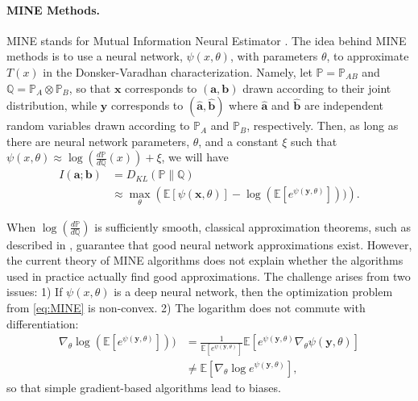 \documentclass[twoside]{article}
\theoremstyle{definition}
\newcommand{\E}{\mathbb{E}}
\newcommand{\Prob}{\mathbb{P}}
\newcommand{\Q}{\mathbb{Q}}
\newcommand{\1}[1]{\scalebox{1.25}{$\mathds{1}$}\left[#1\right]}
\begin{document}
\paragraph{\bf MINE Methods.}
MINE stands for Mutual Information Neural Estimator \cite{belghazi2018mutual}. The idea behind MINE methods is to use a neural network, $\psi(x,\theta)$, with parameters $\theta$, to approximate $T(x)$ in the Donsker-Varadhan characterization. Namely, let $\Prob=\Prob_{AB}$ and $\Q=\Prob_{A}\otimes \Prob_B$, so that $\bm{x}$ corresponds to $(\bm{a},\bm{b})$ drawn according to their joint distribution, while $\bm{y}$ corresponds to $(\hat{\bm{a}},\hat{\bm{b}})$ where $\hat{\bm{a}}$ and $\hat{\bm{b}}$ are independent random variables drawn according to $\Prob_A$ and $\Prob_B$, respectively. Then, as long as there are neural network parameters, $\theta$, and a constant $\xi$ such that $\psi(x,\theta)\approx \log\left(\frac{d\Prob}{d\Q}(x) \right)+\xi$, we will have
\begin{align}
\nonumber
I(\bm{a};\bm{b})&=D_{KL}(\Prob\|\Q)\\
\label{eq:MINE}
&\approx \max_{\theta}\left( \E[\psi(\bm{x},\theta)] - \log(\E[e^{\psi(\bm{y},\theta)}]))\right).
\end{align}


When $\log\left(\frac{d\Prob}{d\Q} \right)$ is sufficiently smooth, classical approximation theorems, such as described in \cite{pinkus1999approximation}, guarantee that good neural network approximations exist. However, the current theory of MINE algorithms does not explain whether the algorithms used in practice actually find good approximations. The challenge arises from two issues: 1) If $\psi(x,\theta)$ is a deep neural network,  then the optimization problem from \eqref{eq:MINE} is non-convex. 2) The logarithm does not commute with differentiation:
\begin{align*}
 \nabla_{\theta}\log(\E[e^{\psi(\bm{y},\theta)}]))&=\frac{1}{\E[e^{\psi(\bm{y},\theta)}]}\E\left[
e^{\psi(\bm{y},\theta)}\nabla_{\theta} \psi(\bm{y},\theta)
\right] \\
&\ne \E\left[\nabla_{\theta} \log e^{\psi(\bm{y},\theta)}\right],
\end{align*}
 so that simple gradient-based algorithms lead to biases. 
\end{document}
